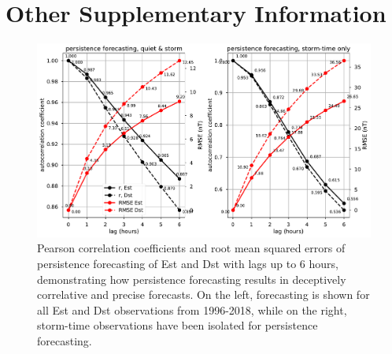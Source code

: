 \documentclass{agujournal2018}
\begin{document}
\section*{Other Supplementary Information}

\begin{figure}[htbp]
   \centering
   \includegraphics[width=1\textwidth]{figures/supplement/persistence.pdf}
   \caption{Pearson correlation coefficients and root mean squared errors of persistence forecasting of Est and Dst with lags up to 6 hours, demonstrating how persistence forecasting results in deceptively correlative and precise forecasts. On the left, forecasting is shown for all Est and Dst observations from 1996-2018, while on the right, storm-time observations have been isolated for persistence forecasting.}
   \label{fig:persistence}
\end{figure}
\end{document}
